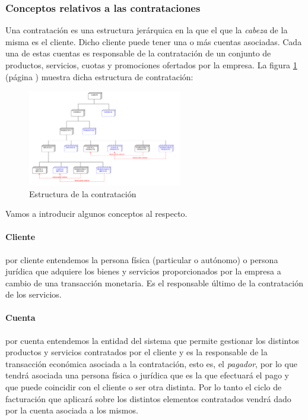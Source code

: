 \subsubsection{Conceptos relativos a las contrataciones}
\label{sub:contratacion-conceptos}

Una contratación es una estructura jerárquica en la que el que la \textit{cabeza} de la misma es el cliente. Dicho cliente puede tener una o más cuentas asociadas. Cada una de estas cuentas es responsable de la contratación de un conjunto de productos, servicios, cuotas y promociones ofertados por la empresa. La figura \ref{fig:estructura-contratacion} (página \pageref{fig:estructura-contratacion}) muestra dicha estructura de contratación:

\begin{figure}[H]
  \centering
  \includegraphics[width=0.60\textwidth]{imaxes/estructura-contratacion.png}
  \caption{Estructura de la contratación}
  \label{fig:estructura-contratacion}
\end{figure}


Vamos a introducir algunos conceptos al respecto.

\paragraph{Cliente} por cliente entendemos la persona física (particular o autónomo) o persona jurídica que adquiere los bienes y servicios proporcionados por la empresa a cambio de una transacción monetaria. Es el responsable último de la contratación de los servicios.

\paragraph{Cuenta} por cuenta entendemos la entidad del sistema que permite gestionar los distintos productos y servicios contratados por el cliente y es la responsable de la transacción económica asociada a la contratación, esto es, el \textit{pagador}, por lo que tendrá asociada una persona física o jurídica que es la que efectuará el pago y que puede coincidir con el cliente o ser otra distinta. Por lo tanto el ciclo de facturación que aplicará sobre los distintos elementos contratados vendrá dado por la cuenta asociada a los mismos.

